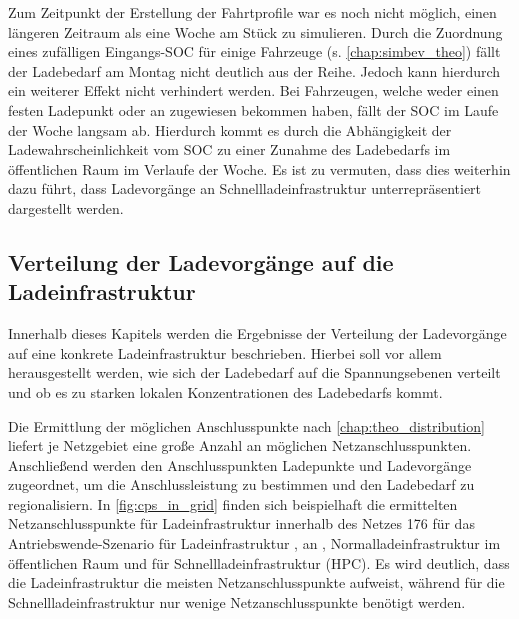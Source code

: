 

Zum Zeitpunkt der Erstellung der Fahrtprofile war es noch nicht möglich, einen längeren Zeitraum als eine Woche am Stück zu simulieren.
Durch die Zuordnung eines zufälligen Eingangs-\gls{SOC} für einige Fahrzeuge (s. \autoref{chap:simbev_theo}) fällt der Ladebedarf am Montag nicht deutlich aus der Reihe.
Jedoch kann hierdurch ein weiterer Effekt nicht verhindert werden.
Bei Fahrzeugen, welche weder einen festen Ladepunkt \zH oder an \Firmeparkplaetzen zugewiesen bekommen haben, fällt der \gls{SOC} im Laufe der Woche langsam ab.
Hierdurch kommt es durch die Abhängigkeit der Ladewahrscheinlichkeit vom \gls{SOC} zu einer Zunahme des Ladebedarfs im öffentlichen Raum im Verlaufe der Woche.
Es ist zu vermuten, dass dies weiterhin dazu führt, dass Ladevorgänge an Schnellladeinfrastruktur un­ter­re­prä­sen­tiert dargestellt werden.


\subsection{Verteilung der Ladevorgänge auf die Ladeinfrastruktur}\label{chap:distribute_demand_ev}

Innerhalb dieses Kapitels werden die Ergebnisse der Verteilung der Ladevorgänge auf eine konkrete Ladeinfrastruktur beschrieben.
Hierbei soll vor allem herausgestellt werden, wie sich der Ladebedarf auf die Spannungsebenen verteilt und ob es zu starken lokalen Konzentrationen des Ladebedarfs kommt.\medskip

Die Ermittlung der möglichen Anschlusspunkte nach \autoref{chap:theo_distribution} liefert je Netzgebiet eine große Anzahl an möglichen Netzanschlusspunkten.
Anschließend werden den Anschlusspunkten Ladepunkte und Ladevorgänge zugeordnet, um die Anschlussleistung zu bestimmen und den Ladebedarf zu regionalisiern.
In \autoref{fig:cps_in_grid} finden sich beispielhaft die ermittelten Netzanschlusspunkte für Ladeinfrastruktur innerhalb des Netzes \num{176} für das Antriebswende-Szenario für Ladeinfrastruktur \zHdot, an \Firmeparkplaetzendot, Normalladeinfrastruktur im öffentlichen Raum und für Schnellladeinfrastruktur (\gls{HPC}).
Es wird deutlich, dass die Ladeinfrastruktur \zH die meisten Netzanschlusspunkte aufweist, während für die Schnellladeinfrastruktur nur wenige Netzanschlusspunkte benötigt werden.



